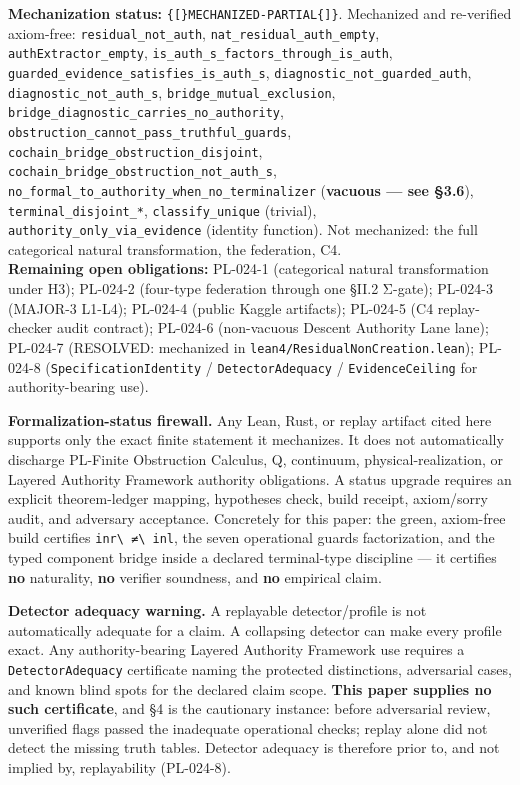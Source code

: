 \documentclass[
  10pt,
]{article}
\DeclareRobustCommand{\texttt}[1]{{\paperSymbolFont\nolinkurl{#1}}}
\begin{document}
\textbf{Mechanization status:} \texttt{{[}MECHANIZED-PARTIAL{]}}. Mechanized and re-verified axiom-free: \texttt{residual\_not\_auth}, \texttt{nat\_residual\_auth\_empty}, \texttt{authExtractor\_empty}, \texttt{is\_auth\_s\_factors\_through\_is\_auth}, \texttt{guarded\_evidence\_satisfies\_is\_auth\_s}, \texttt{diagnostic\_not\_guarded\_auth}, \texttt{diagnostic\_not\_auth\_s}, \texttt{bridge\_mutual\_exclusion}, \texttt{bridge\_diagnostic\_carries\_no\_authority}, \texttt{obstruction\_cannot\_pass\_truthful\_guards}, \texttt{cochain\_bridge\_obstruction\_disjoint}, \texttt{cochain\_bridge\_obstruction\_not\_auth\_s}, \texttt{no\_formal\_to\_authority\_when\_no\_terminalizer} (\textbf{vacuous --- see §3.6}), \texttt{terminal\_disjoint\_*}, \texttt{classify\_unique} (trivial), \texttt{authority\_only\_via\_evidence} (identity function). Not mechanized: the full categorical natural transformation, the federation, C4.\\
\textbf{Remaining open obligations:} PL-024-1 (categorical natural transformation under H3); PL-024-2 (four-type federation through one §II.2 Σ-gate); PL-024-3 (MAJOR-3 L1-L4); PL-024-4 (public Kaggle artifacts); PL-024-5 (C4 replay-checker audit contract); PL-024-6 (non-vacuous Descent Authority Lane lane); PL-024-7 (RESOLVED: mechanized in \texttt{lean4/ResidualNonCreation.lean}); PL-024-8 (\texttt{SpecificationIdentity} / \texttt{DetectorAdequacy} / \texttt{EvidenceCeiling} for authority-bearing use).

\textbf{Formalization-status firewall.} Any Lean, Rust, or replay artifact cited here supports only the exact finite statement it mechanizes. It does not automatically discharge PL-Finite Obstruction Calculus, Q, continuum, physical-realization, or Layered Authority Framework authority obligations. A status upgrade requires an explicit theorem-ledger mapping, hypotheses check, build receipt, axiom/sorry audit, and adversary acceptance. Concretely for this paper: the green, axiom-free build certifies \texttt{inr\ ≠\ inl}, the seven operational guards factorization, and the typed component bridge inside a declared terminal-type discipline --- it certifies \textbf{no} naturality, \textbf{no} verifier soundness, and \textbf{no} empirical claim.

\textbf{Detector adequacy warning.} A replayable detector/profile is not automatically adequate for a claim. A collapsing detector can make every profile exact. Any authority-bearing Layered Authority Framework use requires a \texttt{DetectorAdequacy} certificate naming the protected distinctions, adversarial cases, and known blind spots for the declared claim scope. \textbf{This paper supplies no such certificate}, and §4 is the cautionary instance: before adversarial review, unverified flags passed the inadequate operational checks; replay alone did not detect the missing truth tables. Detector adequacy is therefore prior to, and not implied by, replayability (PL-024-8).
\end{document}
